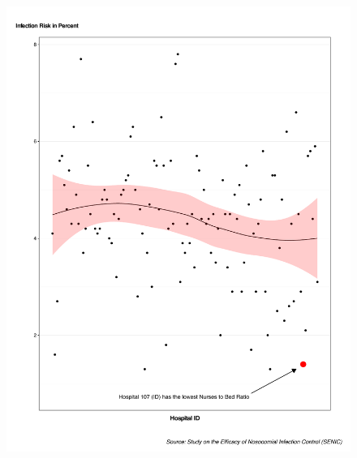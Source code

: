 \documentclass[11pt]{article}
\begin{document}
\begin{figure}[H]
  \centering
   \includegraphics[scale=0.5]{Assignment_3.pdf}
\end{figure}
\end{document}
